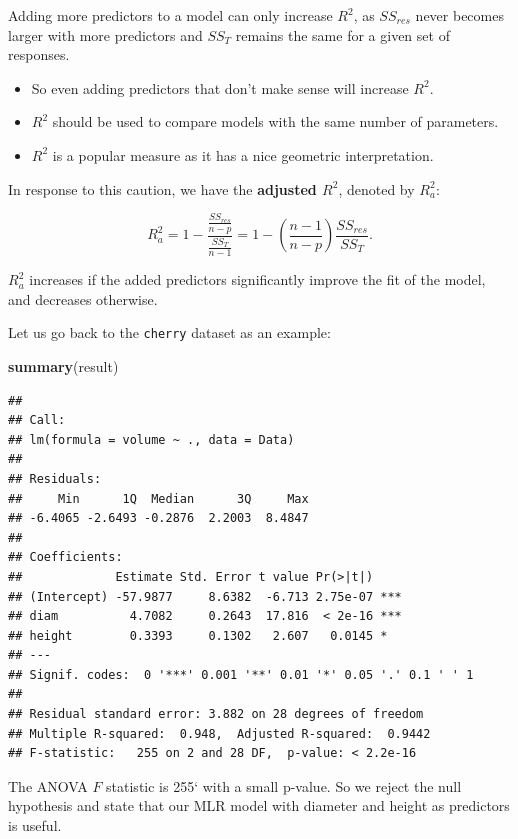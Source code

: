 \documentclass[
]{book}
\newenvironment{Shaded}{\begin{snugshade}}{\end{snugshade}}
\newcommand{\FunctionTok}[1]{\textcolor[rgb]{0.13,0.29,0.53}{\textbf{#1}}}
\newcommand{\NormalTok}[1]{#1}
\providecommand{\tightlist}{%
  \setlength{\itemsep}{0pt}\setlength{\parskip}{0pt}}
\begin{document}
Adding more predictors to a model can only increase \(R^2\), as \(SS_{res}\) never becomes larger with more predictors and \(SS_T\) remains the same for a given set of responses.

\begin{itemize}
\tightlist
\item
  So even adding predictors that don't make sense will increase \(R^2\).
\item
  \(R^2\) should be used to compare models with the same number of parameters.
\item
  \(R^2\) is a popular measure as it has a nice geometric interpretation.
\end{itemize}

In response to this caution, we have the \textbf{adjusted \(R^2\)}, denoted by \(R_{a}^{2}\):

\begin{equation} 
R_{a}^{2} = 1 - \frac{\frac{SS_{res}}{n-p}}{\frac{SS_T}{n-1}} = 1 - \left(\frac{n-1}{n-p} \right) \frac{SS_{res}}{SS_T}.
\label{eq:6adjusted}
\end{equation}

\(R_{a}^{2}\) increases if the added predictors significantly improve the fit of the model, and decreases otherwise.

Let us go back to the \texttt{cherry} dataset as an example:

\begin{Shaded}
\begin{Highlighting}[]
\FunctionTok{summary}\NormalTok{(result)}
\end{Highlighting}
\end{Shaded}

\begin{verbatim}
## 
## Call:
## lm(formula = volume ~ ., data = Data)
## 
## Residuals:
##     Min      1Q  Median      3Q     Max 
## -6.4065 -2.6493 -0.2876  2.2003  8.4847 
## 
## Coefficients:
##             Estimate Std. Error t value Pr(>|t|)    
## (Intercept) -57.9877     8.6382  -6.713 2.75e-07 ***
## diam          4.7082     0.2643  17.816  < 2e-16 ***
## height        0.3393     0.1302   2.607   0.0145 *  
## ---
## Signif. codes:  0 '***' 0.001 '**' 0.01 '*' 0.05 '.' 0.1 ' ' 1
## 
## Residual standard error: 3.882 on 28 degrees of freedom
## Multiple R-squared:  0.948,  Adjusted R-squared:  0.9442 
## F-statistic:   255 on 2 and 28 DF,  p-value: < 2.2e-16
\end{verbatim}

The ANOVA \(F\) statistic is 255` with a small p-value. So we reject the null hypothesis and state that our MLR model with diameter and height as predictors is useful.
\end{document}
